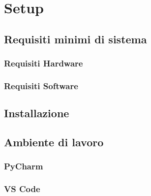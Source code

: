 \section{Setup}

\subsection{Requisiti minimi di sistema}

\subsubsection{Requisiti Hardware}

\subsubsection{Requisiti Software}

\subsection{Installazione}

\subsection{Ambiente di lavoro}

\subsubsection{PyCharm}

\subsubsection{VS Code}

